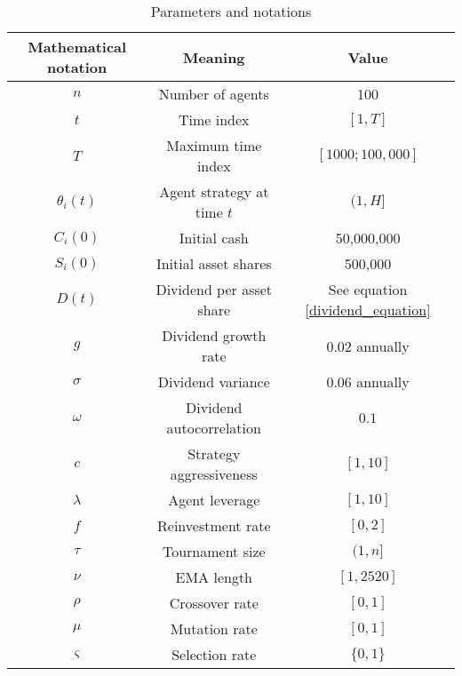 \documentclass{article}
\begin{document}

\begin{table}[]
    \centering
    \begin{tabular}{c|c|c}
    Mathematical notation & Meaning & Value \\
    \hline
        $n$ & Number of agents & 100 \\
        $t$ & Time index & $[1,T]$\\
        $T$ & Maximum time index & $[1000;100,000]$\\
        $\theta_i(t)$ & Agent strategy at time $t$ & $(1, H]$\\
        $C_i(0)$ & Initial cash & 50,000,000 \\
        $S_i(0)$ & Initial asset shares & 500,000 \\
        $D(t)$ & Dividend per asset share & See equation \ref{dividend_equation} \\
        $g$ & Dividend growth rate & $0.02$ annually \\
        $\sigma$ & Dividend variance & $0.06$ annually \\
        $\omega$ & Dividend autocorrelation & $0.1$ \\
        $c$ & Strategy aggressiveness & $[1,10]$ \\
        $\lambda$ & Agent leverage & $[1,10]$ \\
        $f$ & Reinvestment rate & $[0,2]$ \\
        $\tau$ & Tournament size & $(1,n]$ \\
        $\nu$ & EMA length & $[1,2520]$ \\
        $\rho$ & Crossover rate & $[0,1]$ \\
        $\mu$ & Mutation rate & $[0,1]$ \\
        $\varsigma$ & Selection rate & $\{0,1\}$
    \end{tabular}
    \caption{Parameters and notations}
    \label{parameters_correspondence}
\end{table}
\end{document}
